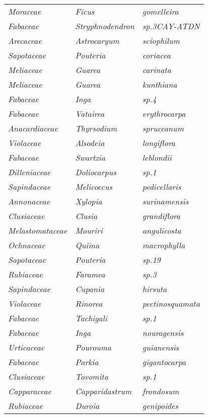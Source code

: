 \documentclass[fleqn,10pt]{ArtEcoFoG} %
\renewenvironment{table}{\begin{table*}}{\end{table*}\ignorespacesafterend}
\begin{document}
\begin{table}
\begin{tabular}[t]{lll}
\em{Moraceae} & \em{Ficus} & \em{gomelleira}\\
\addlinespace
\em{Fabaceae} & \em{Stryphnodendron} & \em{sp.3CAY-ATDN}\\
\em{Arecaceae} & \em{Astrocaryum} & \em{sciophilum}\\
\em{Sapotaceae} & \em{Pouteria} & \em{coriacea}\\
\em{Meliaceae} & \em{Guarea} & \em{carinata}\\
\em{Meliaceae} & \em{Guarea} & \em{kunthiana}\\
\addlinespace
\em{Fabaceae} & \em{Inga} & \em{sp.4}\\
\em{Fabaceae} & \em{Vatairea} & \em{erythrocarpa}\\
\em{Anacardiaceae} & \em{Thyrsodium} & \em{spruceanum}\\
\em{Violaceae} & \em{Alsodeia} & \em{longiflora}\\
\em{Fabaceae} & \em{Swartzia} & \em{leblondii}\\
\addlinespace
\em{Dilleniaceae} & \em{Doliocarpus} & \em{sp.1}\\
\em{Sapindaceae} & \em{Melicoccus} & \em{pedicellaris}\\
\em{Annonaceae} & \em{Xylopia} & \em{surinamensis}\\
\em{Clusiaceae} & \em{Clusia} & \em{grandiflora}\\
\em{Melastomataceae} & \em{Mouriri} & \em{angulicosta}\\
\addlinespace
\em{Ochnaceae} & \em{Quiina} & \em{macrophylla}\\
\em{Sapotaceae} & \em{Pouteria} & \em{sp.19}\\
\em{Rubiaceae} & \em{Faramea} & \em{sp.3}\\
\em{Sapindaceae} & \em{Cupania} & \em{hirsuta}\\
\em{Violaceae} & \em{Rinorea} & \em{pectinosquamata}\\
\addlinespace
\em{Fabaceae} & \em{Tachigali} & \em{sp.1}\\
\em{Fabaceae} & \em{Inga} & \em{nouragensis}\\
\em{Urticaceae} & \em{Pourouma} & \em{guianensis}\\
\em{Fabaceae} & \em{Parkia} & \em{gigantocarpa}\\
\em{Clusiaceae} & \em{Tovomita} & \em{sp.1}\\
\addlinespace
\em{Capparaceae} & \em{Capparidastrum} & \em{frondosum}\\
\em{Rubiaceae} & \em{Duroia} & \em{genipoides}\\

\end{tabular}
\end{table}
\end{document}
